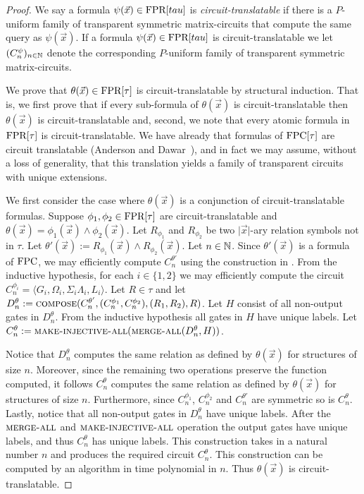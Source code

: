 \documentclass[../paper.tex]{subfiles}
\begin{document}
\begin{proof}
  We say a formula $\psi(\vec{x}) \in \text{\upshape FPR}[tau]$ is \emph{circuit-translatable}
  if there is a $P$-uniform family of transparent symmetric matrix-circuits that
  compute the same query as $\psi(\vec{x})$. If a formula $\psi(\vec{x}) \in
  \text{\upshape FPR}[tau]$ is circuit-translatable we let $(C^\psi_n)_{n \in \mathbb{N}}$ denote
  the corresponding $P$-uniform family of transparent symmetric matrix-circuits.

  We prove that $\theta(\vec{x}) \in \text{\upshape FPR}[\tau]$ is circuit-translatable by
  structural induction. That is, we first prove that if every sub-formula of
  $\theta(\vec{x})$ is circuit-translatable then $\theta(\vec{x})$ is
  circuit-translatable and, second, we note that every atomic formula in
  $\text{\upshape FPR}[\tau]$ is circuit-translatable. We have already that formulas of
  $\text{\upshape FPC}[\tau]$ are circuit translatable (Anderson and Dawar~\cite{AndersonD17}),
  and in fact we may assume, without a loss of generality, that this translation
  yields a family of transparent circuits with unique extensions.
  
  We first consider the case where $\theta(\vec{x})$ is a conjunction of
  circuit-translatable formulas. Suppose $\phi_1, \phi_2 \in \text{\upshape FPR}[\tau]$ are
  circuit-translatable and $\theta (\vec{x}) = \phi_1(\vec{x}) \land
  \phi_2(\vec{x})$. Let $R_{\phi_1}$ and $R_{\phi_2}$ be two $\vert \vec{x}
  \vert$-ary relation symbols not in $\tau$. Let $\theta' (\vec{x}) :=
  R_{\phi_1}(\vec{x}) \land R_{\phi_2}(\vec{x})$. Let $n \in \mathbb{N}$. Since
  $\theta'(\vec{x})$ is a formula of $\text{\upshape FPC}$, we may efficiently compute
  $C^{\theta'}_n$ using the construction in \cite{AndersonD17}. From the
  inductive hypothesis, for each $i \in \{1,2\}$ we may efficiently compute the
  circuit $C^{\phi_i}_n = \langle G_i, \Omega_i, \Sigma_i \Lambda_i, L_i
  \rangle$. Let $R \in \tau$ and let $D^{\theta}_n :=
  {\normalfont\textsc{compose}}(C^{\theta'}_n, (C^{\phi_1}_n, C^{\phi_2}_n), (R_1, R_2), R)$. Let
  $H$ consist of all non-output gates in $D^{\theta}_n$. From the inductive
  hypothesis all gates in $H$ have unique labels. Let $C^{\theta}_n :=
  {\normalfont\textsc{make-injective-all}}({\normalfont\textsc{merge-all}}(D^{\theta}_n, H))$.
  
  Notice that $D^{\theta}_n$ computes the same relation as defined by
  $\theta(\vec{x})$ for structures of size $n$. Moreover, since the remaining
  two operations preserve the function computed, it follows $C^{\theta}_n$
  computes the same relation as defined by $\theta(\vec{x})$ for structures of
  size $n$. Furthermore, since $C^{\phi_1}_n$, $C^{\phi_2}_n$ and $C^{\theta'}_n$
  are symmetric so is $C^{\theta}_n$. Lastly, notice that all non-output gates
  in $D^{\theta}_n$ have unique labels. After the ${\normalfont\textsc{merge-all}}$ and
  ${\normalfont\textsc{make-injective-all}}$ operation the output gates have unique labels, and
  thus $C^{\theta}_n$ has unique labels. This construction takes in a natural
  number $n$ and produces the required circuit $C^{\theta}_n$. This construction
  can be computed by an algorithm in time polynomial in $n$. Thus
  $\theta(\vec{x})$ is circuit-translatable.


\end{proof}
\end{document}

